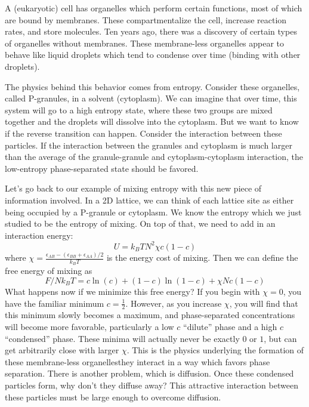 \documentclass[a4paper,twoside,master.tex]{subfiles}
\begin{document}
A (eukaryotic) cell has organelles which perform certain functions, most of which are bound by membranes. These compartmentalize the cell, increase reaction rates, and store molecules. Ten years ago, there was a discovery of certain types of organelles without membranes. These membrane-less organelles appear to behave like liquid droplets which tend to condense over time (binding with other droplets).

The physics behind this behavior comes from entropy. Consider these organelles, called P-granules, in a solvent (cytoplasm). We can imagine that over time, this system will go to a high entropy state, where these two groups are mixed together and the droplets will dissolve into the cytoplasm. But we want to know if the reverse transition can happen. Consider the interaction between these particles. If the interaction between the granules and cytoplasm is much larger than the average of the granule-granule and cytoplasm-cytoplasm interaction, the low-entropy phase-separated state should be favored.

Let's go back to our example of mixing entropy with this new piece of information involved. In a 2D lattice, we can think of each lattice site as either being occupied by a P-granule or cytoplasm. We know the entropy which we just studied to be the entropy of mixing. On top of that, we need to add in an interaction energy:
\begin{equation}
    U = k_B T N^2 \chi c(1-c)
\end{equation}
where $ \chi = \frac{\epsilon_{AB} -(\epsilon_{BB} + \epsilon_{AA})/2}{k_B T} $ is the energy cost of mixing. Then we can define the free energy of mixing as
\begin{equation}
    F/Nk_BT = c \ln(c) + (1-c) \ln(1-c) + \chi Nc(1-c)
\end{equation}
What happens now if we minimize this free energy? If you begin with $ \chi = 0 $, you have the familiar minimum $ c = \frac{1}{2} $. However, as you increase $ \chi $, you will find that this minimum slowly becomes a maximum, and phase-separated concentrations will become more favorable, particularly a low $ c $ ``dilute'' phase and a high $ c $ ``condensed'' phase. These minima will actually never be exactly $ 0 $ or $ 1 $, but can get arbitrarily close with larger $ \chi $. This is the physics underlying the formation of these membrane-less organelles\textemdash they interact in a way which favors phase separation. There is another problem, which is diffusion. Once these condensed particles form, why don't they diffuse away? This attractive interaction between these particles must be large enough to overcome diffusion.
\end{document}
